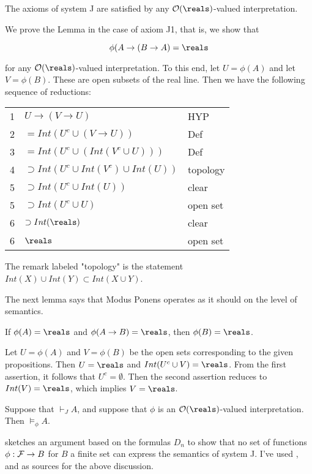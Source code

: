 \begin{lemma} The axioms of system J are satisfied by any $\opensets(\reals)$-valued
interpretation.
\end{lemma}

We  prove the Lemma in the case of axiom J1, that is, we show that

$$
\phi(A \to (B \to A) = \reals
$$

for any $\opensets(\reals)$-valued interpretation.  To this end, let $U = \phi(A)$ and let $V = \phi(B)$.  These are open subsets of the real line.  Then we have the following sequence of reductions:

\begin{indent}
\begin{tabular}{lll}
1 & $U \to (V \to U)$ & HYP \\
2 & $= Int (U^c \cup (V \to U))$ & Def \\
3 & $= Int (U^c \cup (Int(V^c \cup U)))$ & Def \\
4 & $ \supset Int(U^c \cup Int(V^c) \cup Int(U))$ & topology \\
5 & $\supset Int(U^c \cup Int(U))$ & clear \\
5 & $\supset Int(U^c \cup U)$ & open set \\
6 & $\supset Int(\reals)$ &clear \\
6 & $\reals$ & open set \\
\end{tabular}
\end{indent}

The remark labeled "topology" is the statement $Int(X) \cup Int(Y) \subset Int(X \cup Y)$.

The next lemma says that Modus Ponens operates as it should
on the level of semantics.

\begin{lemma}
If $\phi(A) = \reals$ and $\phi(A \to B) = \reals$, then $\phi(B) = \reals$.
\end{lemma}

 Let $U = \phi(A)$ and $V = \phi(B)$ be the open sets corresponding to the given propositions.  Then $U = \reals$ and $Int( U^c \cup V) = \reals$.  From the first assertion, it follows that $U^c = \emptyset$.  Then the second assertion reduces to $Int(V) = \reals$, which implies $V = \reals$. 

\begin{theorem}
Suppose that $\vdash_J A$, and suppose that $\phi$ is an $\opensets(\reals)$-valued interpretation.  Then $\models_\phi A$.
\end{theorem}


\cite{RH} sketches an argument based on the formulas $D_n$ to show that no set of functions $\phi: \mathcal{F} \to B$ for $B$ a finite set can express the semantics of system J. I've used \cite{RH}, \cite{WKIL} and \cite{EPS} as sources for the above discussion.
